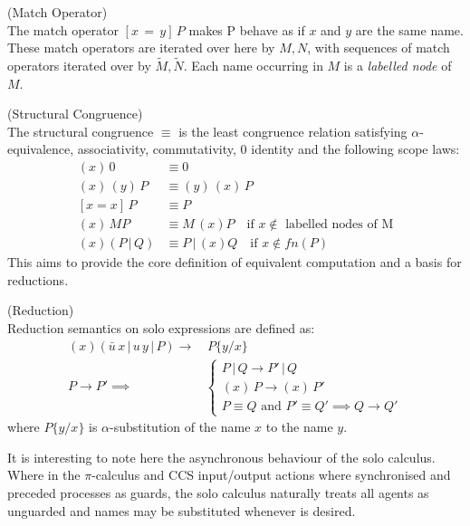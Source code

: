     \begin{definition}{(Match Operator)\\}
        The match operator $[x \, = \, y] \, P$ makes P behave as if $x$ and $y$ are the same name.
        These match operators are iterated over here by $M, N$, with sequences of match operators iterated over by $\tilde{M}, \tilde{N}$.
        Each name occurring in $M$ is a \textit{labelled node} of $M$.
    \end{definition}


    \begin{definition}{(Structural Congruence)\\}
        The structural congruence $\equiv$ is the least congruence relation satisfying $\alpha$-equivalence, associativity, commutativity, 0 identity and the following scope laws:
        \begin{align}
            (x) \, 0            & \equiv 0 \\
            (x) \, (y) \, P     & \equiv (y) \, (x) \, P \\
            [x=x] \, P          & \equiv P \\
            (x) \, M P          & \equiv M \, (x)P \quad \text{if $x \notin$ labelled nodes of M} \\
            (x)(P \, | \, Q)    & \equiv P \, | \, (x)Q \quad \text{if $x \notin fn(P)$}
        \end{align}
        This aims to provide the core definition of equivalent computation and a basis for reductions.
    \end{definition}


    \begin{definition}{(Reduction)\\}
        Reduction semantics on solo expressions are defined as:
        \begin{align}
            (x)(\bar{u} \, x \, | \, u \, y \, | \, P) \rightarrow & \, P\{y / x\} \\
            P \rightarrow P' \implies &
            \begin{cases}
                P \, | \, Q \rightarrow P' \, | \, Q \\
                (x) \, P \rightarrow (x) \, P' \\
                P \equiv Q \text{ and } P' \equiv Q' \implies Q \rightarrow Q'
            \end{cases}
        \end{align}
        where $P\{y / x\}$ is $\alpha$-substitution of the name $x$ to the name $y$.
    \end{definition}
    It is interesting to note here the asynchronous behaviour of the solo calculus.
    Where in the $\pi$-calculus and CCS input/output actions where synchronised and preceded processes as guards, the solo calculus naturally treats all agents as unguarded and names may be substituted whenever is desired.



